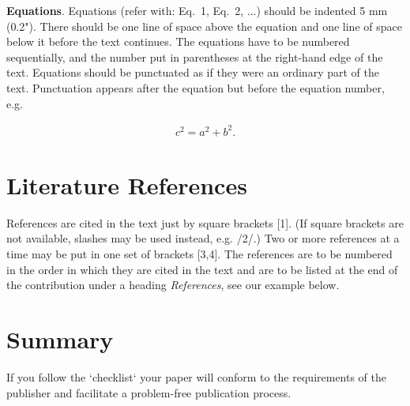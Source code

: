 \documentclass{ttp}
\begin{document}
\vspace{6pt}
\textbf{Equations}.  Equations (refer with: Eq.~1, Eq.~2, ...) should be indented 5 mm (0.2").
There should be one line of space above the equation and one line of space below it before the text continues.
The equations have to be numbered sequentially, and the number put in parentheses at the right-hand edge of the
text. Equations should be punctuated as if they were an ordinary part of the text. Punctuation appears after the
equation but before the equation number, e.g.

\begin{eqnarray}
c^2 = a^2 + b^2.
\end{eqnarray}

\section{Literature References}

\noindent References are cited in the text just by square brackets [1].
 (If square brackets are not available, slashes may be used instead, e.g. /2/.)
Two or more references at a time may be put in one set of brackets [3,4]. The
references are to be numbered in the order in which they are cited in the text and
are to be listed at the end of the contribution under a heading \textit{References},
see our example below.

\section{Summary}
\noindent If you follow the `checklist` your paper will conform to the requirements
 of the publisher and facilitate a problem-free publication process.
\end{document}

